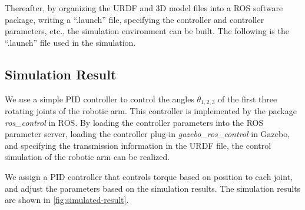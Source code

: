 \documentclass{article}
\begin{document}
Thereafter, by organizing the URDF and 3D model files into a ROS software package, writing a ``.launch'' file, specifying the controller and controller parameters, etc., the simulation environment can be built.
The following is the ``.launch'' file used in the simulation.


\subsection{Simulation Result}


We use a simple PID controller to control the angles $\theta_{1,2,3}$ of the first three rotating joints of the robotic arm.
This controller is implemented by the package \emph{ros\_control} in ROS.
By loading the controller parameters into the ROS parameter server, loading the controller plug-in \emph{gazebo\_ros\_control} in Gazebo, and specifying the transmission information in the URDF file, the control simulation of the robotic arm can be realized.

We assign a PID controller that controls torque based on position to each joint, and adjust the parameters based on the simulation results.
The simulation results are shown in \autoref{fig:simulated-result}.
\end{document}

